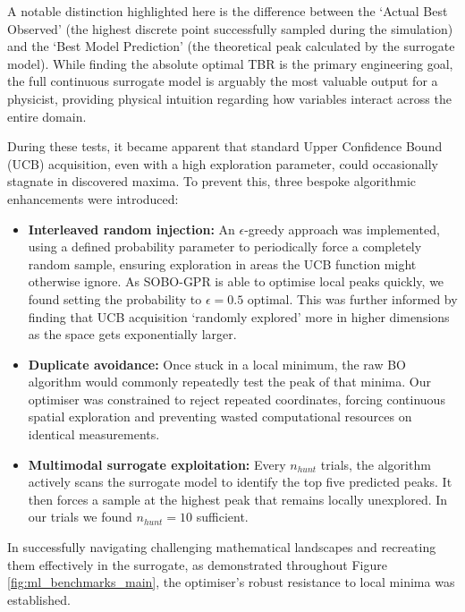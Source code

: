\documentclass[11pt]{article}
\begin{document}
A notable distinction highlighted here is the difference between the `Actual Best Observed' (the
highest discrete point successfully sampled during the simulation) and the `Best Model Prediction'
(the theoretical peak calculated by the surrogate model). While finding the absolute optimal TBR is
the primary engineering goal, the full continuous surrogate model is arguably the most valuable
output for a physicist, providing physical intuition regarding how variables interact across the
entire domain.

During these tests, it became apparent that standard Upper Confidence Bound (UCB) acquisition, even
with a high exploration parameter, could occasionally stagnate in discovered maxima. To prevent
this, three bespoke algorithmic enhancements were introduced:

\begin{itemize}
    \item \textbf{Interleaved random injection:} An $\epsilon$-greedy approach was implemented,
    using a defined probability parameter to periodically force a completely random sample, ensuring
    exploration in areas the UCB function might otherwise ignore. As SOBO-GPR is able to optimise
    local peaks quickly, we found setting the probability to $\epsilon=0.5$ optimal. This was
    further informed by finding that UCB acquisition `randomly explored' more in higher dimensions
    as the space gets exponentially larger.
    \item \textbf{Duplicate avoidance:} Once stuck in a local minimum, the raw BO algorithm would
    commonly repeatedly test the peak of that minima. Our optimiser was constrained to reject
    repeated coordinates, forcing continuous spatial exploration and preventing wasted computational
    resources on identical measurements.
    \item \textbf{Multimodal surrogate exploitation:} Every $n_{hunt}$ trials, the algorithm
    actively scans the surrogate model to identify the top five predicted peaks. It then forces a
    sample at the highest peak that remains locally unexplored. In our trials we found $n_{hunt}=10$
    sufficient.
\end{itemize}

In successfully navigating challenging mathematical landscapes and recreating them
effectively in the surrogate, as demonstrated throughout Figure \ref{fig:ml_benchmarks_main}, the
optimiser's robust resistance to local minima was established.
\end{document}
